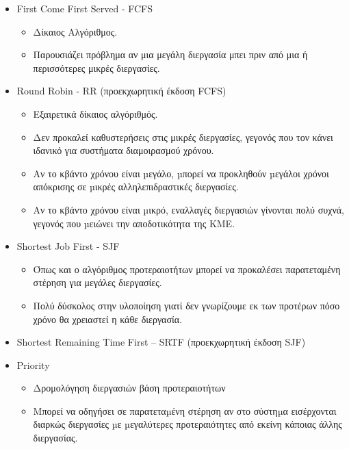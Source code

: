 \begin{itemize}
	\item	First Come First Served - FCFS
		\begin{itemize}
			\item	Δίκαιος Αλγόριθμος.
			\item	Παρουσιάζει πρόβλημα αν μια μεγάλη διεργασία μπει πριν από μια ή περισσότερες
				μικρές διεργασίες.
		\end{itemize}
	\item	Round Robin - RR (προεκχωρητική έκδοση FCFS)
		\begin{itemize}
			\item	Εξαιρετικά δίκαιος αλγόριθμός.
			\item	Δεν προκαλεί καθυστερήσεις στις μικρές διεργασίες, γεγονός που τον κάνει ιδανικό
				για συστήματα διαμοιρασμού χρόνου.
			\item	Αν το κβάντο χρόνου είναι µεγάλο, µπορεί να προκληθούν µεγάλοι χρόνοι
				απόκρισης σε µικρές αλληλεπιδραστικές διεργασίες.
			\item	Αν το κβάντο χρόνου είναι µικρό, εναλλαγές διεργασιών γίνονται πολύ συχνά, 
				γεγονός που µειώνει την αποδοτικότητα της ΚΜΕ.
		\end{itemize}
	\item	Shortest Job First - SJF
		\begin{itemize}
			\item	Όπως και ο αλγόριθμος προτεραιοτήτων μπορεί να προκαλέσει παρατεταμένη
				στέρηση για μεγάλες διεργασίες.
			\item	Πολύ δύσκολος στην υλοποίηση γιατί δεν γνωρίζουμε εκ των προτέρων πόσο
				χρόνο θα χρειαστεί η κάθε διεργασία.
		\end{itemize}
	\item 	Shortest Remaining Time First – SRTF (προεκχωρητική έκδοση SJF)
	\item	Priority
		\begin{itemize}
			\item	Δρομολόγηση διεργασιών βάση προτεραιοτήτων
			\item	Μπορεί να οδηγήσει σε παρατεταµένη στέρηση αν στο σύστηµα εισέρχονται διαρκώς
				διεργασίες µε µεγαλύτερες προτεραιότητες από εκείνη κάποιας άλλης διεργασίας.
		\end{itemize}
\end{itemize}
